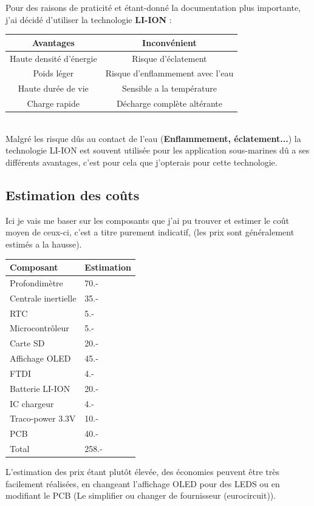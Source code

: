 {{Pour des raisons de praticité et étant-donné la documentation plus importante, j'ai décidé d'utiliser la technologie \textbf{LI-ION} : \\

\centering
\begin{tabular}{c|c}
    Avantages &  Inconvénient\\
    \hline
    Haute densité d'énergie & Risque d'éclatement \\
    Poids léger & Risque d'enflammement avec l'eau \\ 
    Haute durée de vie & Sensible a la température \\
    Charge rapide & Décharge complète altérante \\
\end{tabular}
\vspace{+8pt}
\\ Malgré les risque dûs au contact de l'eau (\textbf{Enflammement, éclatement...}) la technologie LI-ION est souvent utilisée pour les application sous-marines dû a ses différents avantages, c'est pour cela que j'opterais pour cette technologie. 

}

}

\newpage
\subsection{Estimation des coûts} \label{ssec:EstPrix}
{
    Ici je vais me baser sur les composants que j'ai pu trouver et estimer le coût moyen de ceux-ci, c'est a titre purement indicatif, (les prix sont généralement estimés a la hausse).
    \vspace{+12pt}
    
    \begin{center}
        \begin{tabular}{l|l}
            Composant & Estimation \\
            \hline
            Profondimètre & 70.- \\
            Centrale inertielle & 35.- \\
            RTC & 5.- \\
            Microcontrôleur & 5.- \\
            Carte SD & 20.- \\
            Affichage OLED & 45.- \\
            FTDI & 4.- \\
            Batterie LI-ION & 20.- \\
            IC chargeur & 4.- \\
            Traco-power 3.3V & 10.- \\
            PCB & 40.- \\
            \hline
            \hline
            Total & 258.-
        \end{tabular} 
    \end{center}
	

    L'estimation des prix étant plutôt élevée, des économies peuvent être très facilement réalisées, en changeant l'affichage OLED pour des LEDS ou en modifiant le PCB (Le simplifier ou changer de fournisseur (eurocircuit)).

}

